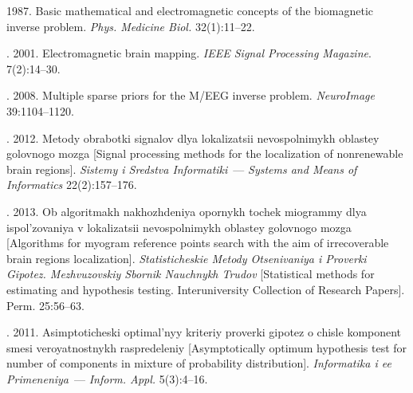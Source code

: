   \begin{multicols}{2}

\renewcommand{\bibname}{\protect\rmfamily References}

{\small\frenchspacing
{%
\begin{thebibliography}{99}

 1987. Basic mathematical and electromagnetic concepts of the
biomagnetic inverse problem. \textit{Phys. Medicine Biol.} 32(1):11--22.

.
2001. Electromagnetic brain mapping. \textit{IEEE Signal Processing Magazine}.
7(2):14--30.



.
2008. Multiple sparse priors for the M/EEG inverse problem.
\textit{NeuroImage} 39:1104--1120.

. 2012. Metody obrabotki signalov dlya lokalizatsii
nevospolnimykh oblastey golovnogo mozga
[Signal processing methods for the localization of nonrenewable brain regions].
\textit{Sistemy i Sredstva Informatiki}~--- \textit{Systems and
Means of Informatics} 22(2):157--176.

.
2013.  Ob algoritmakh nakhozhdeniya opornykh tochek miogrammy dlya ispol'zovaniya
v lokalizatsii nevospolnimykh oblastey golovnogo mozga
[Algorithms for myogram reference points search with the aim of irrecoverable
brain regions localization]. \textit{Statisticheskie Metody Otsenivaniya i
Proverki Gipotez. Mezhvuzovskiy Sbornik Nauchnykh Trudov}
[Statistical methods for estimating and hypothesis testing.
Interuniversity Collection of Research Papers]. Perm. 25:56--63.

. 2011.
Asimptoticheski optimal'nyy kriteriy proverki gipotez o chisle komponent
smesi veroyatnostnykh raspredeleniy [Asymptotically optimum hypothesis
test for number of components in mixture of probability distribution].
\textit{Informatika i ee Primeneniya}~--- \textit{Inform. Appl.} 5(3):4--16.


\end{thebibliography}}}
\end{multicols}
